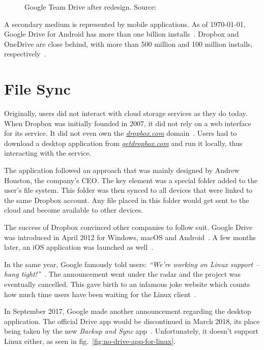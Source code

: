 \begin{figure}[bpt]
\caption{Google Team Drive after redesign. Source:~\cite{google_drive_ui_updates}}
\label{fig:drive-after}
\centering
{}
\end{figure}


A secondary medium is represented by mobile applications. As of \monthyeardate\today, Google Drive for Android has more than one billion installs~\cite{google_drive_android_app}. Dropbox and OneDrive are close behind, with more than 500 million and 100 million installs, respectively~\cite{dropbox_android_app,one_drive_android_app}.

\section{File Sync}

Originally, users did not interact with cloud storage services as they do today. When Dropbox was initially founded in 2007, it did not rely on a web interface for its service. It did not even own the \emph{\url{dropbox.com}} domain~\cite{dropbox_acquires_dropbox_dot_com}. Users had to download a desktop application from \emph{\url{getdropbox.com}} and run it locally, thus interacting with the service.

The application followed an approach that was mainly designed by Andrew Houston, the company's CEO. The key element was a special folder added to the user's file system. This folder was then synced to all devices that were linked to the same Dropbox account. Any file placed in this folder would get sent to the cloud and become available to other devices.

The success of Dropbox convinced other companies to follow suit. Google Drive was introduced in April 2012 for Windows, macOS and Android~\cite{introducing_google_drive}. A few months later, an iOS application was launched as well~\cite{hands_on_with_the_google_drive_for_ios_app}.

In the same year, Google famously told users: \emph{``We're working on Linux support -- hang tight!''}~\cite{google_drive_for_linux_is_on_the_way}. The announcement went under the radar and the project was eventually cancelled. This gave birth to an infamous joke website which counts how much time users have been waiting for the Linux client~\cite{how_long_since_google_said_hang_tight}.

In September 2017, Google made another announcement regarding the desktop application. The official Drive app would be discontinued in March 2018, its place being taken by the new \emph{Backup and Sync} app~\cite{introducing_backup_and_sync,google_drive_is_being_replaced_by_backup_and_sync}. Unfortunately, it doesn't support Linux either, as seen in fig.~\ref{fig:no-drive-app-for-linux}.

